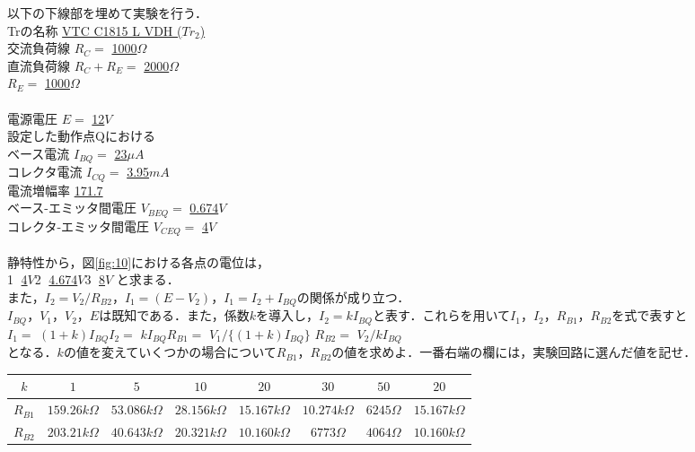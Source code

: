 \documentclass[10pt, a4j, dvipdfmx]{jarticle}
\begin{document}
    以下の下線部を埋めて実験を行う．\\
    Trの名称 \underline{VTC C1815 L VDH ($Tr_2$)}\\
    交流負荷線 $R_C = $    \underline{1000}$\Omega$\\
    直流負荷線 $R_C + R_E = $  \underline{2000}$\Omega$\\
               $R_E = $     \underline{1000}$\Omega$\\
    \\
    電源電圧 $E = $ \underline{12}$V$\\
    設定した動作点Qにおける\\
    ベース電流 $I_{BQ} = $ \underline{23}$\mu A$\\
    コレクタ電流 $I_{CQ} = $ \underline{3.95}$mA$\\
    電流増幅率 \underline{171.7}\\
    ベース-エミッタ間電圧 $V_{BEQ} = $ \underline{0.674}$V$\\
    コレクタ-エミッタ間電圧 $V_{CEQ} = $ \underline{4}$V$\\
    \\
    静特性から，図\ref{fig:10}における各点の電位は，\\
    \hspace{7mm}\textcircled{\scriptsize 1} \underline{4}$V$\hspace{7mm}\textcircled{\scriptsize 2} \underline{4.674}$V$\hspace{7mm}\textcircled{\scriptsize 3} \underline{8}$V$ と求まる．\\
    また，$I_2 = V_2 / R_{B2}$，$I_1 = (E - V_2)$，$I_1 = I_2 + I_{BQ}$の関係が成り立つ．\\
    $I_{BQ}$，$V_1$，$V_2$，$E$は既知である．また，係数$k$を導入し，$I_2 = k I_{BQ}$と表す．これらを用いて$I_1$，$I_2$，$R_{B1}$，$R_{B2}$を式で表すと\\
    \hspace{7mm}$I_1 = $ \underline{$(1+k)I_{BQ}$}\hspace{7mm}$I_2 = $ \underline{$kI_{BQ}$}\hspace{7mm}$R_{B1} = $ \underline{$V_1/\{(1+k)I_{BQ}\}$} $R_{B2} = $ \underline{$V_2/kI_{BQ}$}\\
    となる．$k$の値を変えていくつかの場合について$R_{B1}$，$R_{B2}$の値を求めよ．一番右端の欄には，実験回路に選んだ値を記せ．
    \begin{table}[H]
        \begin{tabular}{||c||c|c|c|c|c|c||c||}
        \hline\hline
        $k$      & $1$             & $5$             & $10$            & $20$            & $30$            & $50$         & $20$            \\ \hline\hline
        $R_{B1}$ & $159.26k\Omega$ & $53.086k\Omega$ & $28.156k\Omega$ & $15.167k\Omega$ & $10.274k\Omega$ & $6245\Omega$ & $15.167k\Omega$ \\ \hline
        $R_{B2}$ & $203.21k\Omega$ & $40.643k\Omega$ & $20.321k\Omega$ & $10.160k\Omega$ & $6773\Omega$    & $4064\Omega$ & $10.160k\Omega$ \\ \hline\hline
        \end{tabular}
    \end{table}
\end{document}
